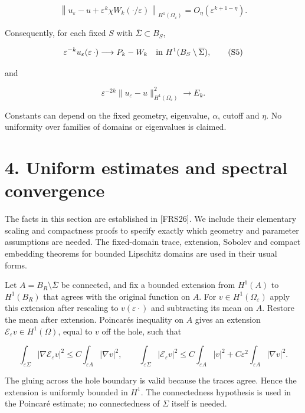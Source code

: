 \documentclass[11pt]{article}
\begin{document}
\[
 \left\|u_\varepsilon-u+
   \varepsilon^k\chi W_k(\cdot/\varepsilon)\right\|_{H^1(\Omega_\varepsilon)}
 =O_\eta(\varepsilon^{k+1-\eta}).
 \tag{S4}
\]

Consequently, for each fixed \(S\) with \(\overline\Sigma\subset B_S\),

\[
 \varepsilon^{-k}u_\varepsilon(\varepsilon\,\cdot)
 \longrightarrow P_k-W_k
 \quad\hbox{in }H^1(B_S\setminus\overline\Sigma),
 \tag{S5}
\]

and

\[
 \varepsilon^{-2k}\|u_\varepsilon-u\|_{H^1(\Omega_\varepsilon)}^2
 \longrightarrow E_k.
 \tag{S6}
\]

Constants can depend on the fixed geometry, eigenvalue, \(\alpha\),
cutoff and \(\eta\). No uniformity over families of domains or
eigenvalues is claimed.

\section{4. Uniform estimates and spectral
convergence}\label{uniform-estimates-and-spectral-convergence}

The facts in this section are established in {[}FRS26{]}. We include
their elementary scaling and compactness proofs to specify exactly which
geometry and parameter assumptions are needed. The fixed-domain trace,
extension, Sobolev and compact embedding theorems for bounded Lipschitz
domains are used in their usual forms.

Let \(A=B_R\setminus\overline\Sigma\) be connected, and fix a bounded
extension from \(H^1(A)\) to \(H^1(B_R)\) that agrees with the original
function on \(A\). For \(v\in H^1(\Omega_\varepsilon)\) apply this
extension after rescaling to \(v(\varepsilon\cdot)\) and subtracting its
mean on \(A\). Restore the mean after extension.
Poincaré\textquotesingle s inequality on \(A\) gives an extension
\(\mathscr E_\varepsilon v\in H^1(\Omega)\), equal to \(v\) off the
hole, such that

\[
 \int_{\varepsilon\Sigma}|\nabla\mathscr E_\varepsilon v|^2
       \le C\int_{\varepsilon A}|\nabla v|^2,
 \qquad
 \int_{\varepsilon\Sigma}|\mathscr E_\varepsilon v|^2
       \le C\int_{\varepsilon A}|v|^2
                  +C\varepsilon^2\int_{\varepsilon A}|\nabla v|^2.
 \tag{F1}
\]

The gluing across the hole boundary is valid because the traces agree.
Hence the extension is uniformly bounded in \(H^1\). The connectedness
hypothesis is used in the Poincaré estimate; no connectedness of
\(\Sigma\) itself is needed.
\end{document}
